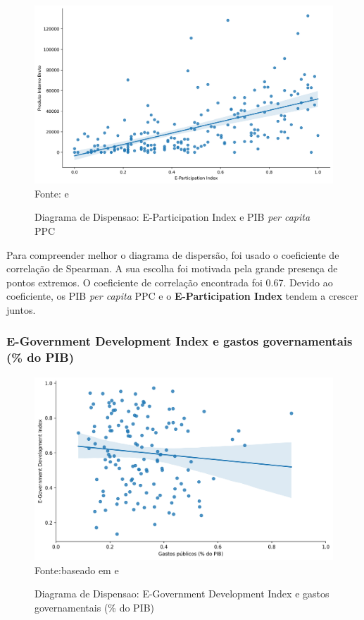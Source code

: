 \begin{figure}[H]
	\centering
	\caption{Diagrama de Dispensao: E-Participation Index e PIB \textit{per capita} PPC}
	\includegraphics[width=1\linewidth]{figuras/egdi/dispensao_epart_pib}
	\label{fig:dispensao_epart_pib}
	\footnotesize{Fonte: \cite{ONU_EGDI_mapa} e \cite{WB_pib_per_capita_países}}
\end{figure}

Para compreender melhor o diagrama de dispersão, foi usado o coeficiente de correlação de Spearman. A sua escolha foi motivada pela grande presença de pontos extremos. O coeficiente de correlação encontrada foi 0.67. Devido ao coeficiente, os PIB \textit{per capita} PPC e o \textbf{E-Participation Index} tendem a crescer juntos.

\subsubsection{E-Government Development Index e gastos governamentais (\% do PIB)}

\begin{figure}[H]
	\centering
	\caption{Diagrama de Dispensao: E-Government Development Index e gastos governamentais (\% do PIB)}
	\includegraphics[width=1\linewidth]{figuras/egdi/dispersao_egov_govexpenditure}
	\label{fig:dispersao_egov_govexpenditure}
	\footnotesize{Fonte:baseado em \cite{ONU_EGDI_mapa} e \cite{FMI_gov_expenditure}}
\end{figure}

